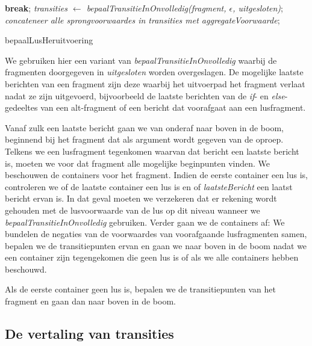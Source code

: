 \begin{algorithm}
{{{{{{	}{
	\textbf{break};}
	}}
	{
	\textit{transities $\leftarrow$ bepaalTransitieInOnvolledig(fragment, $\epsilon$, uitgesloten)}; \\
	\textit{concateneer alle sprongvoorwaardes in transities met aggregateVoorwaarde}; \\
	}
	}
	}}
	\caption{bepaalLusHeruitvoering}
	\label{alg:calculateLoopReentry}
\end{algorithm}

We gebruiken hier een variant van \textit{bepaalTransitieInOnvolledig} waarbij de fragmenten doorgegeven in \textit{uitgesloten} worden overgeslagen.
De mogelijke laatste berichten van een fragment zijn deze waarbij het uitvoerpad het fragment verlaat nadat ze zijn uitgevoerd, bijvoorbeeld de laatste berichten van de \textit{if}- en \textit{else}-gedeeltes van een alt-fragment of een bericht dat voorafgaat aan een lusfragment.

Vanaf zulk een laatste bericht gaan we van onderaf naar boven in de boom, beginnend bij het fragment dat als argument wordt gegeven van de oproep. Telkens we een lusfragment tegenkomen waarvan dat bericht een laatste bericht is, moeten we voor dat fragment alle mogelijke beginpunten vinden. We beschouwen de containers voor het fragment. Indien de eerste container een lus is, controleren we of de laatste container een lus is en of \textit{laatsteBericht} een laatst bericht ervan is. In dat geval moeten we verzekeren dat er rekening wordt gehouden met de lusvoorwaarde van de lus op dit niveau wanneer we \textit{bepaalTransitieInOnvolledig} gebruiken. Verder gaan we de containers af: We bundelen de negaties van de voorwaardes van voorafgaande lusfragmenten samen, bepalen we de transitiepunten ervan en gaan we naar boven in de boom nadat we een container zijn tegengekomen die geen lus is of als we alle containers hebben beschouwd.

Als de eerste container geen lus is, bepalen we de transitiepunten van het fragment en gaan dan naar boven in de boom.

\subsection{De vertaling van transities}\label{sec:process-frag}


